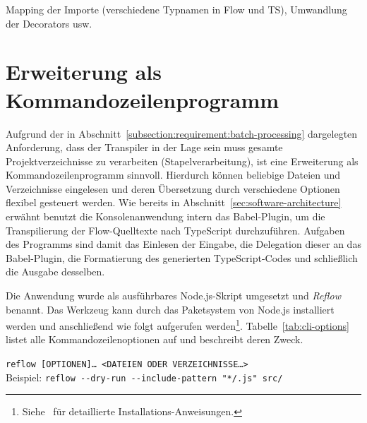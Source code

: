 Mapping der Importe (verschiedene Typnamen in Flow und TS), Umwandlung der Decorators usw.

\section{Erweiterung als Kommandozeilenprogramm}

Aufgrund der in Abschnitt~\ref{subsection:requirement:batch-processing} dargelegten Anforderung, dass der Transpiler in der Lage sein muss gesamte Projektverzeichnisse zu verarbeiten (Stapelverarbeitung), ist eine Erweiterung als Kommandozeilenprogramm sinnvoll. Hierdurch können beliebige Dateien und Verzeichnisse eingelesen und deren Übersetzung durch verschiedene Optionen flexibel gesteuert werden. Wie bereits in Abschnitt~\ref{sec:software-architecture} erwähnt benutzt die Konsolenanwendung intern das Babel-Plugin, um die Transpilierung der Flow-Quelltexte nach TypeScript durchzuführen. Aufgaben des Programms sind damit das Einlesen der Eingabe, die Delegation dieser an das Babel-Plugin, die Formatierung des generierten TypeScript-Codes und schließlich die Ausgabe desselben.

Die Anwendung wurde als ausführbares Node.js-Skript umgesetzt und \textit{Reflow} benannt. Das Werkzeug kann durch das Paketsystem von Node.js installiert werden und anschließend wie folgt aufgerufen werden\footnote{Siehe~\autocite{REFLOW_GITHUB} für detaillierte Installations-Anweisungen.}. Tabelle~\ref{tab:cli-options} listet alle Kommandozeilenoptionen auf und beschreibt deren Zweck.

{
  \texttt{reflow [OPTIONEN]… <DATEIEN ODER VERZEICHNISSE…>}\\
  Beispiel: \texttt{reflow -{}-dry-run -{}-include-pattern "{}*/.js"{} src/}
}

